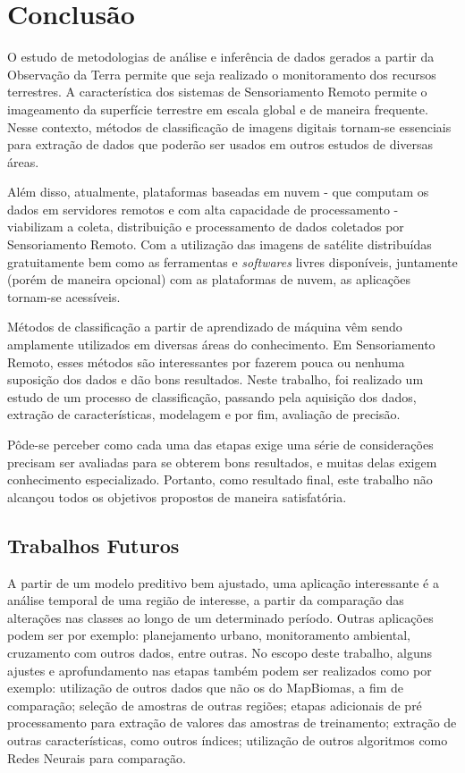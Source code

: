 \chapter{Conclusão}\label{conclusuxe3o}

    O estudo de metodologias de análise e inferência de dados gerados a
partir da Observação da Terra permite que seja realizado o monitoramento
dos recursos terrestres. A característica dos sistemas de Sensoriamento
Remoto permite o imageamento da superfície terrestre em escala global e
de maneira frequente. Nesse contexto, métodos de classificação de
imagens digitais tornam-se essenciais para extração de dados que poderão
ser usados em outros estudos de diversas áreas.

    Além disso, atualmente, plataformas baseadas em nuvem - que computam
os dados em servidores remotos e com alta capacidade de processamento -
viabilizam a coleta, distribuição e processamento de dados coletados por
Sensoriamento Remoto. Com a utilização das imagens de satélite
distribuídas gratuitamente bem como as ferramentas e \emph{softwares}
livres disponíveis, juntamente (porém de maneira opcional) com as
plataformas de nuvem, as aplicações tornam-se acessíveis.

    Métodos de classificação a partir de aprendizado de máquina vêm sendo
amplamente utilizados em diversas áreas do conhecimento. Em
Sensoriamento Remoto, esses métodos são interessantes por fazerem pouca
ou nenhuma suposição dos dados e dão bons resultados. Neste trabalho,
foi realizado um estudo de um processo de classificação, passando pela
aquisição dos dados, extração de características, modelagem e por fim,
avaliação de precisão.

    Pôde-se perceber como cada uma das etapas exige uma série de
considerações precisam ser avaliadas para se obterem bons resultados, e
muitas delas exigem conhecimento especializado. Portanto, como resultado
final, este trabalho não alcançou todos os objetivos propostos de
maneira satisfatória.

\section{Trabalhos Futuros}\label{trabalhos-futuros}

    A partir de um modelo preditivo bem ajustado, uma aplicação
interessante é a análise temporal de uma região de interesse, a partir
da comparação das alterações nas classes ao longo de um determinado
período. Outras aplicações podem ser por exemplo: planejamento urbano,
monitoramento ambiental, cruzamento com outros dados, entre outras. No
escopo deste trabalho, alguns ajustes e aprofundamento nas etapas também
podem ser realizados como por exemplo: utilização de outros dados que
não os do MapBiomas, a fim de comparação; seleção de amostras de outras
regiões; etapas adicionais de pré processamento para extração de valores
das amostras de treinamento; extração de outras características, como
outros índices; utilização de outros algoritmos como Redes Neurais para
comparação.
